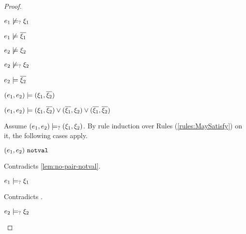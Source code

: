 \begin{proof}
\begin{byCases}
\begin{byCases}
\begin{byCases}
\begin{pfsteps*}
            \item $e_1 \not\models_{?} \xi_1$  
            \item $e_1 \not\models \overline{\xi_1}$  
            \item $e_2 \not\models \xi_2$  
            \item $e_2 \not\models_{?} \xi_2$  
            \item $e_2 \models \overline{\xi_2}$  
            \item $(e_1 , e_2) \models (\xi_1 , \overline{\xi_2})$  
            \item $(e_1 , e_2) \models (\xi_1 , \overline{\xi_2}) \vee (\overline{\xi_1} , \xi_2) \vee (\overline{\xi_1} , \overline{\xi_2})$ 
            \end{pfsteps*}
            Assume $(e_1 , e_2) \models_{?} (\xi_1 , \xi_2)$. By rule induction over Rules (\ref{rules:MaySatisfy}) on it, the following cases apply.
            \begin{byCases}
            \item[\text{(\ref{rule:CMSNotVal})}]
                \begin{pfsteps*}
                \item $(e_1 , e_2) ~\mathtt{notval}$ 
                \end{pfsteps*}
                Contradicts \autoref{lem:no-pair-notval}.
            \item[\text{(\ref{rule:CMSPair1})}]
                \begin{pfsteps*}
                \item $e_1 \models_{?} \xi_1$ 
                \end{pfsteps*}
                Contradicts .
            \item[\text{(\ref{rule:CMSPair2})}]
                \begin{pfsteps*}
                \item $e_2 \models_{?} \xi_2$ 

\end{pfsteps*}
\end{byCases}
\end{byCases}
\end{byCases}
\end{byCases}
\end{proof}
